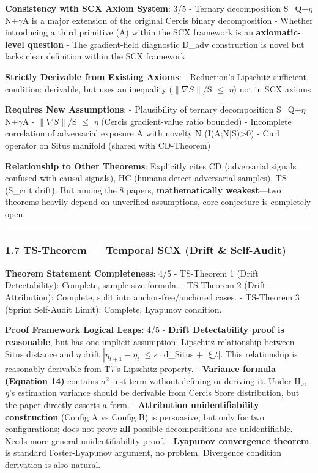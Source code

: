 \documentclass[
  12pt,
]{article}
\begin{document}
\textbf{Consistency with SCX Axiom System}: 3/5
- Ternary decomposition S=Q+$\eta$N+$\gamma$A is a major extension of the original Cercis binary decomposition
- Whether introducing a third primitive (A) within the SCX framework is an \textbf{axiomatic-level question}
- The gradient-field diagnostic D\_adv construction is novel but lacks clear definition within the SCX framework

\textbf{Strictly Derivable from Existing Axioms}:
- Reduction's Lipschitz sufficient condition: derivable, but uses an inequality ($\|\nabla S\|$/S $\leq$ $\eta$) not in SCX axioms

\textbf{Requires New Assumptions}:
- Plausibility of ternary decomposition S=Q+$\eta$N+$\gamma$A
- $\|\nabla S\|$/S $\leq$ $\eta$ (Cercis gradient-value ratio bounded)
- Incomplete correlation of adversarial exposure A with novelty N (I(A;N|S)>0)
- Curl operator on Situs manifold (shared with CD-Theorem)

\textbf{Relationship to Other Theorems}: Explicitly cites CD (adversarial signals confused with causal signals), HC (humans detect adversarial samples), TS (S\_crit drift). But among the 8 papers, \textbf{mathematically weakest}---two theorems heavily depend on unverified assumptions, core conjecture is completely open.

\begin{center}\rule{0.5\linewidth}{0.5pt}\end{center}

\subsubsection{1.7 TS-Theorem --- Temporal SCX (Drift \& Self-Audit)}\label{ts-theorem}

\textbf{Theorem Statement Completeness}: 4/5
- TS-Theorem 1 (Drift Detectability): Complete, sample size formula.
- TS-Theorem 2 (Drift Attribution): Complete, split into anchor-free/anchored cases.
- TS-Theorem 3 (Sprint Self-Audit Limit): Complete, Lyapunov condition.

\textbf{Proof Framework Logical Leaps}: 4/5
- \textbf{Drift Detectability proof is reasonable}, but has one implicit assumption: Lipschitz relationship between Situs distance and $\eta$ drift $|\eta_{t+1} - \eta_t| \leq \kappa\cdot$d\_Situs + $|\xi\_t|$. This relationship is reasonably derivable from T7's Lipschitz property.
- \textbf{Variance formula (Equation 14)} contains $\sigma^2$\_est term without defining or deriving it. Under H$_0$, $\eta$'s estimation variance should be derivable from Cercis Score distribution, but the paper directly asserts a form.
- \textbf{Attribution unidentifiability construction} (Config A vs Config B) is persuasive, but only for two configurations; does not prove \textbf{all} possible decompositions are unidentifiable. Needs more general unidentifiability proof.
- \textbf{Lyapunov convergence theorem} is standard Foster-Lyapunov argument, no problem. Divergence condition derivation is also natural.
\end{document}
